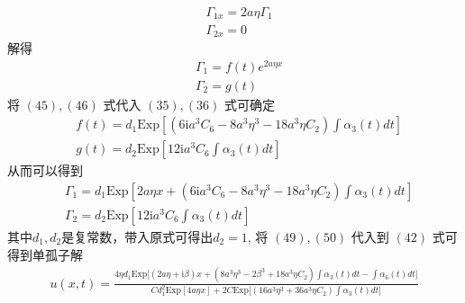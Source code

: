 \begin{align}
  & \Gamma_{1x} = 2a\eta\Gamma_{1} \\
  & \Gamma_{2x} = 0
\end{align}
解得
\begin{align}
  & \Gamma_{1} = f(t)e^{2a\eta x} \\
  & \Gamma_{2} = g(t)
\end{align}
将 $(45), (46)$ 式代入 $(35), (36)$ 式可确定
\begin{align}
  & f(t) = d_{1}\mathrm{Exp}\left[(6\mathrm{i}a^{3}C_{6} - 8a^{3}\eta^{3} - 18a^{3}\eta C_{2})\int \alpha_{3}(t)dt\right] \\
  & g(t) = d_{2}\mathrm{Exp}\left[12\mathrm{i}a^{3}C_{6}\int \alpha_{3}(t)dt\right]
\end{align}
从而可以得到
\begin{align}
  & \Gamma_{1} = d_{1}\mathrm{Exp}\left[2a\eta x + (6\mathrm{i}a^{3}C_{6} - 8a^{3}\eta^{3} - 18a^{3}\eta C_{2})\int \alpha_{3}(t)dt\right] \\
  & \Gamma_{2} = d_{2}\mathrm{Exp}\left[12\mathrm{i}a^{3}C_{6}\int \alpha_{3}(t)dt\right]
\end{align}
其中$d_{1}, d_{2}$是复常数，带入原式可得出$d_{2} = 1$, 将 $(49), (50)$ 代入到 $(42)$ 式可得到单孤子解
\begin{align}
  u(x,t) = \frac{4\eta d_{1}\mathrm{Exp}\Big[(2a\eta+\mathrm{i}\beta)x + (8a^{3}\eta^{3} - 2\beta^{3} + 18a^{3}\eta C_{2})\int \alpha_{3}(t)dt - \int \alpha_{6}(t)dt\Big]}{C d_{1}^{2}\mathrm{Exp}[4a\eta x] + 2C \mathrm{Exp}\Big[(16a^{3}\eta^{3}+36a^{3}\eta C_{2})\int \alpha_{3}(t)dt\Big]}
\end{align}

